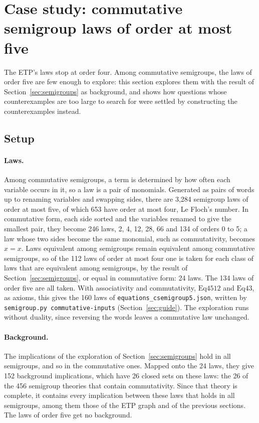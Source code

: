 \documentclass[11pt,a4paper]{article}
\theoremstyle{definition}
\theoremstyle{remark}
\newcommand{\code}[1]{\texttt{#1}}
\newcommand{\Eq}[1]{\mathrm{Eq}#1}
\begin{document}
\section{Case study: commutative semigroup laws of order at most five}\label{sec:csemigroups}

The ETP's laws stop at order four. Among commutative semigroups, the laws of order five are few enough to explore: this section explores them with the result of Section~\ref{sec:semigroups} as background, and shows how questions whose counterexamples are too large to search for were settled by constructing the counterexamples instead.

\subsection{Setup}

\paragraph{Laws.} Among commutative semigroups, a term is determined by how often each variable occurs in it, so a law is a pair of monomials. Generated as pairs of words up to renaming variables and swapping sides, there are 3,284 semigroup laws of order at most five, of which 653 have order at most four, Le Floch's number. In commutative form, each side sorted and the variables renamed to give the smallest pair, they become 246 laws, 2, 4, 12, 28, 66 and 134 of orders 0 to 5; a law whose two sides become the same monomial, such as commutativity, becomes $x = x$. Laws equivalent among semigroups remain equivalent among commutative semigroups, so of the 112 laws of order at most four one is taken for each class of laws that are equivalent among semigroups, by the result of Section~\ref{sec:semigroups}, or equal in commutative form: 24 laws. The 134 laws of order five are all taken. With associativity and commutativity, $\Eq{4512}$ and $\Eq{43}$, as axioms, this gives the 160 laws of \code{equations\_csemigroup5.json}, written by \code{semigroup.py commutative-inputs} (Section~\ref{sec:guide}). The exploration runs without duality, since reversing the words leaves a commutative law unchanged.

\paragraph{Background.} The implications of the exploration of Section~\ref{sec:semigroups} hold in all semigroups, and so in the commutative ones. Mapped onto the 24 laws, they give 152 background implications, which have 26 closed sets on these laws: the 26 of the 456 semigroup theories that contain commutativity. Since that theory is complete, it contains every implication between these laws that holds in all semigroups, among them those of the ETP graph and of the previous sections. The laws of order five get no background.
\end{document}
